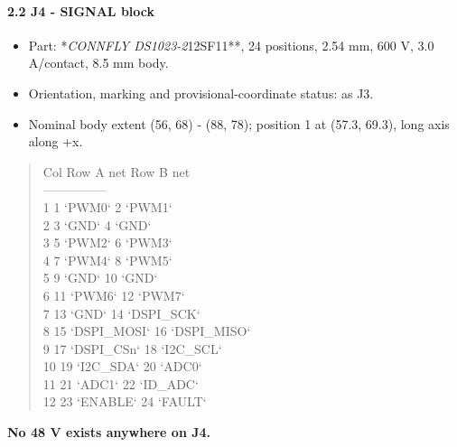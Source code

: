 \documentclass[11pt,a4paper]{article}
\begin{document}
\paragraph*{2.2 J4 - SIGNAL block}
\begin{itemize}
\item Part: {*}\emph{CONNFLY DS1023-2}12SF11{*}{*}, 24 positions, 2.54 mm, 600 V, 3.0 A/contact, 8.5 mm body.
\item Orientation, marking and provisional-coordinate status: as J3.
\item Nominal body extent (56, 68) - (88, 78); position 1 at (57.3, 69.3), long axis along +x.
\end{itemize}
\begin{quote}\small\ttfamily\raggedright
\textbar{} Col \textbar{} Row A \textbar{} net \textbar{} Row B \textbar{} net \textbar{}\\
\textbar{}---\textbar{}---\textbar{}---\textbar{}---\textbar{}---\textbar{}\\
\textbar{} 1 \textbar{} 1 \textbar{} `PWM0` \textbar{} 2 \textbar{} `PWM1` \textbar{}\\
\textbar{} 2 \textbar{} 3 \textbar{} `GND` \textbar{} 4 \textbar{} `GND` \textbar{}\\
\textbar{} 3 \textbar{} 5 \textbar{} `PWM2` \textbar{} 6 \textbar{} `PWM3` \textbar{}\\
\textbar{} 4 \textbar{} 7 \textbar{} `PWM4` \textbar{} 8 \textbar{} `PWM5` \textbar{}\\
\textbar{} 5 \textbar{} 9 \textbar{} `GND` \textbar{} 10 \textbar{} `GND` \textbar{}\\
\textbar{} 6 \textbar{} 11 \textbar{} `PWM6` \textbar{} 12 \textbar{} `PWM7` \textbar{}\\
\textbar{} 7 \textbar{} 13 \textbar{} `GND` \textbar{} 14 \textbar{} `DSPI\_SCK` \textbar{}\\
\textbar{} 8 \textbar{} 15 \textbar{} `DSPI\_MOSI` \textbar{} 16 \textbar{} `DSPI\_MISO` \textbar{}\\
\textbar{} 9 \textbar{} 17 \textbar{} `DSPI\_CSn` \textbar{} 18 \textbar{} `I2C\_SCL` \textbar{}\\
\textbar{} 10 \textbar{} 19 \textbar{} `I2C\_SDA` \textbar{} 20 \textbar{} `ADC0` \textbar{}\\
\textbar{} 11 \textbar{} 21 \textbar{} `ADC1` \textbar{} 22 \textbar{} `ID\_ADC` \textbar{}\\
\textbar{} 12 \textbar{} 23 \textbar{} `ENABLE` \textbar{} 24 \textbar{} `FAULT` \textbar{}
\end{quote}
\textbf{No 48 V exists anywhere on J4.}
\end{document}
